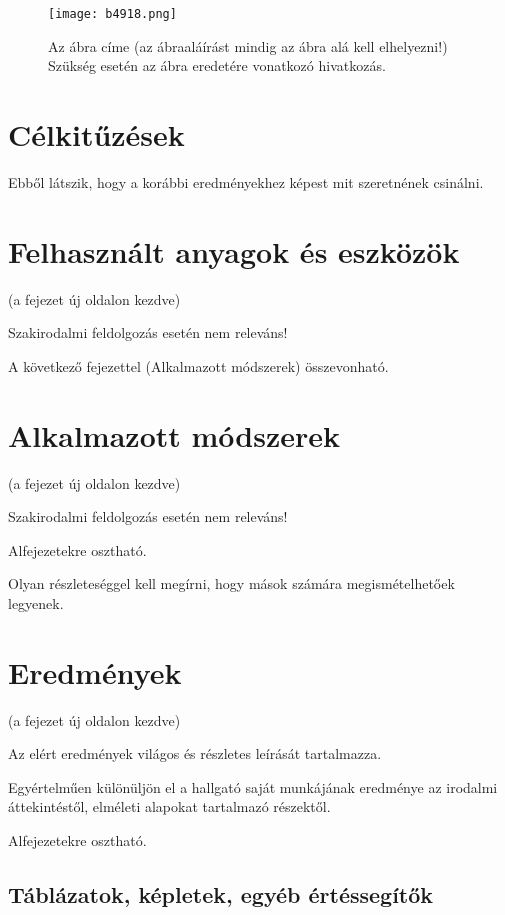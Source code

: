 \documentclass[a4paper,12pt]{report}
\theoremstyle{definition}
\theoremstyle{remark}
\begin{document}
\begin{figure}
\centering
\texttt{[image: b4918.png]}
\caption{ \label{fig:korok} Az ábra címe (az ábraaláírást mindig az ábra alá kell elhelyezni!)
Szükség esetén az ábra eredetére vonatkozó hivatkozás.
}
\end{figure}

\chapter{Célkitűzések}

Ebből látszik, hogy a korábbi eredményekhez képest mit szeretnének csinálni.

\chapter{Felhasznált anyagok és eszközök}

(a fejezet új oldalon kezdve) 

Szakirodalmi feldolgozás esetén nem releváns!

A következő fejezettel (Alkalmazott módszerek) összevonható.

\chapter{Alkalmazott módszerek}

(a fejezet új oldalon kezdve) 

Szakirodalmi feldolgozás esetén nem releváns!


Alfejezetekre osztható. 

Olyan részleteséggel kell megírni, hogy mások számára megismételhetőek legyenek.

\chapter{Eredmények}

(a fejezet új oldalon kezdve) 

Az elért eredmények világos és részletes leírását tartalmazza. 

Egyértelműen különüljön el a hallgató saját munkájának eredménye az irodalmi áttekintéstől, elméleti alapokat tartalmazó részektől.

Alfejezetekre osztható.

\section{Táblázatok, képletek, egyéb értéssegítők}
\end{document}
